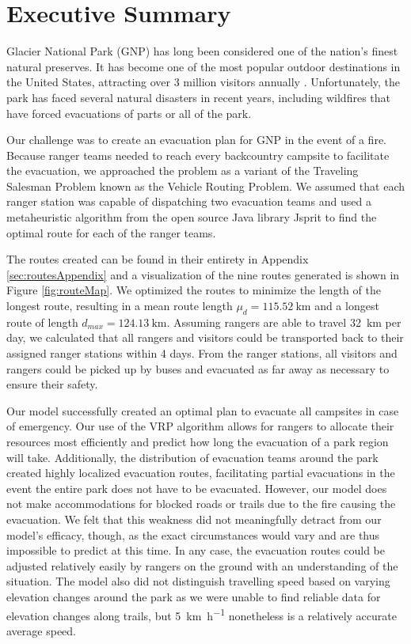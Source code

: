 \documentclass[12pt]{article}
\begin{document}

\section*{Executive Summary}
Glacier National Park (GNP) has long been considered one of the nation's finest natural preserves. It has become one of the most popular outdoor destinations in the United States, attracting over 3 million visitors annually \cite{glacierVisitorStats}. Unfortunately, the park has faced several natural disasters in recent years, including wildfires that have forced evacuations of parts or all of the park.

Our challenge was to create an evacuation plan for GNP in the event of a fire. Because ranger teams needed to reach every backcountry campsite to facilitate the evacuation, we approached the problem as a variant of the Traveling Salesman Problem known as the Vehicle Routing Problem. We assumed that each ranger station was capable of dispatching two evacuation teams and used a metaheuristic algorithm from the open source Java library Jsprit to find the optimal route for each of the ranger teams.

The routes created can be found in their entirety in Appendix \ref{sec:routesAppendix} and a visualization of the nine routes generated is shown in Figure \ref{fig:routeMap}. We optimized the routes to minimize the length of the longest route, resulting in a mean route length $\mu_d = \SI{115.52}{\kilo\meter}$ and a longest route of length $d_{max} = \SI{124.13}{\kilo\meter}$. Assuming rangers are able to travel \SI{32}{\kilo\meter} per day, we calculated that all rangers and visitors could be transported back to their assigned ranger stations within 4 days. From the ranger stations, all visitors and rangers could be picked up by buses and evacuated as far away as necessary to ensure their safety.

Our model successfully created an optimal plan to evacuate all campsites in case of emergency. Our use of the VRP algorithm allows for rangers to allocate their resources most efficiently and predict how long the evacuation of a park region will take. Additionally, the distribution of evacuation teams around the park created highly localized evacuation routes, facilitating partial evacuations in the event the entire park does not have to be evacuated. However, our model does not make accommodations for blocked roads or trails due to the fire causing the evacuation. We felt that this weakness did not meaningfully detract from our model's efficacy, though, as the exact circumstances would vary and are thus impossible to predict at this time. In any case, the evacuation routes could be adjusted relatively easily by rangers on the ground with an understanding of the situation. The model also did not distinguish travelling speed based on varying elevation changes around the park as we were unable to find reliable data for elevation changes along trails, but \SI{5}{\kilo\meter\per\hour} nonetheless is a relatively accurate average speed.
\end{document}
